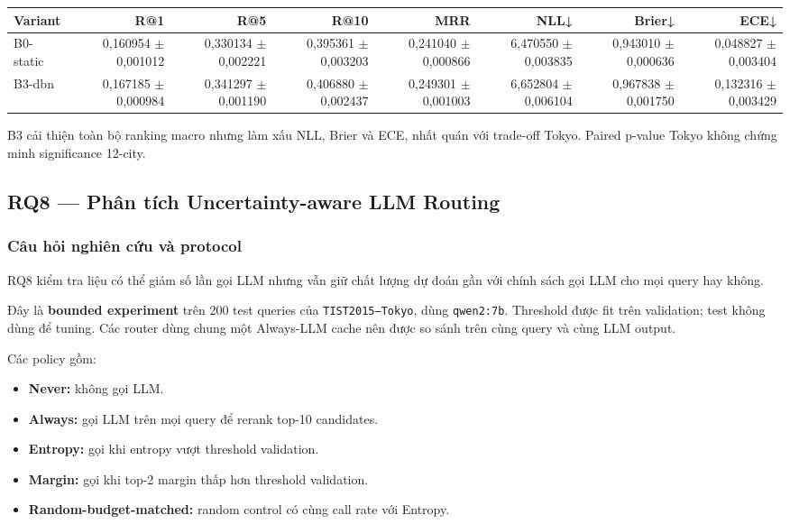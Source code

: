 \begin{table}[!htbp]
\centering
\scriptsize
\setlength{\tabcolsep}{2.5pt}
\begin{adjustbox}{max width=\textwidth}
\begin{tabular}{@{}lrrrrrrr@{}}
\toprule
Variant & R@1 & R@5 & R@10 & MRR & NLL↓ & Brier↓ & ECE↓ \\
\midrule
B0-static & 0,160954 $\pm$ 0,001012 & 0,330134 $\pm$ 0,002221 & 0,395361 $\pm$ 0,003203 & 0,241040 $\pm$ 0,000866 & 6,470550 $\pm$ 0,003835 & 0,943010 $\pm$ 0,000636 & 0,048827 $\pm$ 0,003404 \\
B3-dbn & 0,167185 $\pm$ 0,000984 & 0,341297 $\pm$ 0,001190 & 0,406880 $\pm$ 0,002437 & 0,249301 $\pm$ 0,001003 & 6,652804 $\pm$ 0,006104 & 0,967838 $\pm$ 0,001750 & 0,132316 $\pm$ 0,003429 \\
\bottomrule
\end{tabular}
\end{adjustbox}
\end{table}

B3 cải thiện toàn bộ ranking macro nhưng làm xấu NLL, Brier và ECE, nhất quán với trade-off Tokyo. Paired p-value Tokyo không chứng minh significance 12-city.


\subsection{RQ8 --- Phân tích Uncertainty-aware LLM Routing}

\subsubsection*{Câu hỏi nghiên cứu và protocol}

RQ8 kiểm tra liệu có thể giảm số lần gọi LLM nhưng vẫn giữ chất lượng dự đoán gần với chính sách gọi LLM cho mọi query hay không.

Đây là \textbf{bounded experiment} trên 200 test queries của \texttt{TIST2015--Tokyo}, dùng \texttt{qwen2:7b}. Threshold được fit trên validation; test không dùng để tuning. Các router dùng chung một Always-LLM cache nên được so sánh trên cùng query và cùng LLM output.

Các policy gồm:

\begin{itemize}
\item \textbf{Never:} không gọi LLM.
\item \textbf{Always:} gọi LLM trên mọi query để rerank top-10 candidates.
\item \textbf{Entropy:} gọi khi entropy vượt threshold validation.
\item \textbf{Margin:} gọi khi top-2 margin thấp hơn threshold validation.
\item \textbf{Random-budget-matched:} random control có cùng call rate với Entropy.
\end{itemize}

